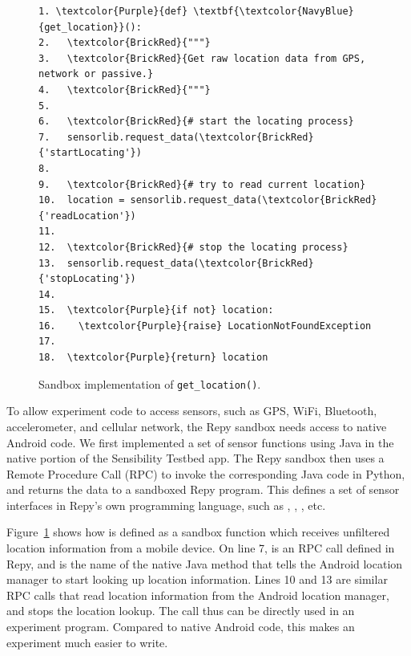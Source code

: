 
\begin{figure}
\begin{Verbatim}
1. \textcolor{Purple}{def} \textbf{\textcolor{NavyBlue}{get_location}}():
2.   \textcolor{BrickRed}{"""}
3.   \textcolor{BrickRed}{Get raw location data from GPS, network or passive.}
4.   \textcolor{BrickRed}{"""}
5. 
6.   \textcolor{BrickRed}{# start the locating process} 
7.   sensorlib.request_data(\textcolor{BrickRed}{'startLocating'})
8.
9.   \textcolor{BrickRed}{# try to read current location}
10.  location = sensorlib.request_data(\textcolor{BrickRed}{'readLocation'})
11.
12.  \textcolor{BrickRed}{# stop the locating process} 
13.  sensorlib.request_data(\textcolor{BrickRed}{'stopLocating'})
14.
15.  \textcolor{Purple}{if not} location:
16.    \textcolor{Purple}{raise} LocationNotFoundException    
17.  
18.  \textcolor{Purple}{return} location
\end{Verbatim}
\caption{\small Sandbox implementation of \texttt{get\_location()}. 
\label{fig-getlocation}}
\end{figure}

To allow experiment code to access sensors, such as 
GPS, WiFi, Bluetooth, accelerometer, and cellular network, the Repy sandbox
needs access to native Android code. We first implemented a set of sensor functions using
Java in the native portion of the Sensibility Testbed app. The Repy 
sandbox then uses a Remote Procedure Call (RPC) to invoke the
corresponding Java code in Python, and returns the data 
to a sandboxed Repy program. This defines a set of sensor interfaces in 
Repy's own programming language, such as , 
, , etc. 

Figure~\ref{fig-getlocation} shows how  
is defined as a sandbox function which receives unfiltered location 
information from a mobile device. 
On line 7,  is an RPC call 
defined in Repy, 
and  is the name of the native Java method that tells the Android 
location manager to start looking up location information. Lines 10 and 13 are similar RPC 
calls that read location information from the Android location manager, and stops the location 
lookup. The call  thus %
can be directly used in an experiment program. Compared to native Android 
code, this makes an experiment much easier to write.

